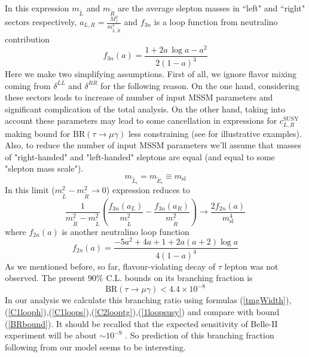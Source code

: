 \documentclass[10pt]{article}
\begin{document}
In this expression $m_{\tilde{L}}$ and $m_{\tilde{R}}$ are the average slepton masses in ``left" and ``right" sectors respectively, $a_{\scriptstyle L,R} = \displaystyle \frac{M_1^2}{m_{\tilde{L},\tilde{R}}^2}$ and $f_{3n}$ is a loop function from neutralino contribution \cite{Heinemeyer,Paradisi}
\begin{equation}
\label{f3n}
f_{3n}(a) = \frac{1+2a \, \log a-a^2}{2(1-a)^3}
\end{equation}
Here we make two simplifying assumptions. First of all, we ignore flavor mixing coming from $\delta^{LL}$ and $\delta^{RR}$ for the following reason. On the one hand, considering these sectors leads to increase of number of input MSSM parameters and significant complication of the total analysis. On the other hand, taking into account these parameters may lead to some cancellation in expressions for $c_{L,R}^{\text{SUSY}}$ making bound for $\text{BR}(\tau \rightarrow \mu \gamma)$ less constraining (see \cite{Heinemeyer} for illustrative examples). Also, to reduce the number of input MSSM parameters we'll assume that masses of "right-handed" and "left-handed" sleptons are equal (and equal to some "slepton mass scale"). 
\[
m_{\tilde{L}_i} = m_{\tilde{E}_i} \equiv m_{\text{sl}}
\]
In this limit ($m_{\tilde{L}}^2 - m_{\tilde{R}}^2 \rightarrow 0$) expression reduces to
\begin{equation}
\label{expres}
\frac{1}{m_{\tilde{R}}^2-m_{\tilde{L}}^2} \left(\frac{f_{3n}(a_L)}{m_{\tilde{L}}^2}-\frac{f_{3n}(a_R)}{m_{\tilde{R}}^2}\right) \longrightarrow \frac{2 f_{2n}(a)}{m_{\text{sl}}^4}
\end{equation}
where $f_{2n}(a)$ is another neutralino loop function \cite{Heinemeyer}
\begin{equation}
\label{f2n}
f_{2n}(a) = \frac{-5a^2+4a+1+2a(a+2)\log a}{4(1-a)^4}
\end{equation}
As we mentioned before, so far, flavour-violating decay of $\tau$ lepton was not observed. The present $90\%$ C.L. bounds on its branching fraction is \cite{BABAR}
\begin{equation}
\label{BRbound}
\text{BR}(\tau \rightarrow \mu \gamma) < 4.4 \times 10^{-8}
\end{equation}
In our analysis we calculate this branching ratio using formulas (\ref{tmgWidth}),(\ref{C1looph}),(\ref{C1loops}),(\ref{C2looptg}),(\ref{1loopsusy}) and compare with bound (\ref{BRbound}). It should be recalled that the expected sensitivity of Belle-II experiment will be about $\sim 10^{-9}$ \cite{BelleII}. So prediction of this branching fraction following from our model seems to be interesting.
\end{document}
